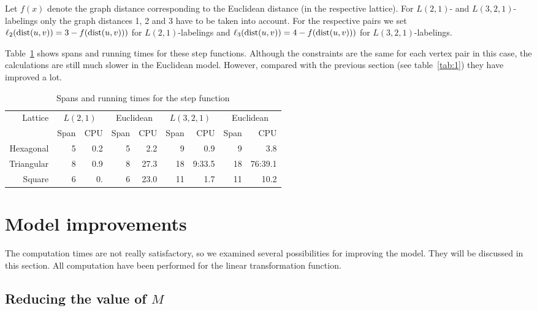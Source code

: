\documentclass[smallextended]{svjour3}
\def\dist{\mathop{\rm dist}}
\begin{document}
Let $f(x)$ denote the graph distance corresponding to the Euclidean distance (in the
respective lattice).
For $L(2,1)$- and $L(3,2,1)$-labelings only the graph distances 1, 2 and 3 have to be taken into account.
For the respective pairs we set $\ell_2(\dist(u,v))=3-f(\dist(u,v)))$
for $L(2,1)$-labelings and $\ell_3(\dist(u,v))=4-f(\dist(u,v)))$ for $L(3,2,1)$-labelings.

Table~\ref{tab:3} shows spans and running times for these step functions.
Although the constraints are the same for each vertex pair in this case, the calculations
are still much slower in the Euclidean model. However, compared with the
previous section (see table~\ref{tab:1}) they have improved a lot.

\begin{table}[h]
\begin{center}
\renewcommand{\arraystretch}{1.3}
\renewcommand{\tabcolsep}{8pt}
\begin{tabular}{|r||r|r|r|r||r|r|r|r|}
\hline 
Lattice  & \multicolumn{2}{c|}{$L(2,1)$} & \multicolumn{2}{c||}{Euclidean} & 
 \multicolumn{2}{c|}{$L(3,2,1)$} & \multicolumn{2}{c|}{Euclidean}\\
  & Span & CPU & Span & CPU & Span & CPU & Span & CPU\\
\hline 
Hexagonal & 5 & 0.2 & 5 & 2.2 & 9 & 0.9 & 9 & 3.8 \\
\hline 
Triangular  & 8 & 0.9 & 8 & 27.3 & 18 & 9:33.5 & 18 & 76:39.1 \\
\hline 
Square     & 6 & 0. & 6  & 23.0 & 11 & 1.7 & 11 & 10.2  \\
\hline 
\end{tabular}
\end{center}
\caption{Spans and running times for the step function}\label{tab:3}
\end{table}

\section{Model improvements}

The computation times are not really satisfactory, so we examined several
possibilities for improving the model. They will be discussed in this section.
All computation have been performed for the linear transformation function.



\FloatBarrier

\subsection{Reducing the value of $M$}
\end{document}
